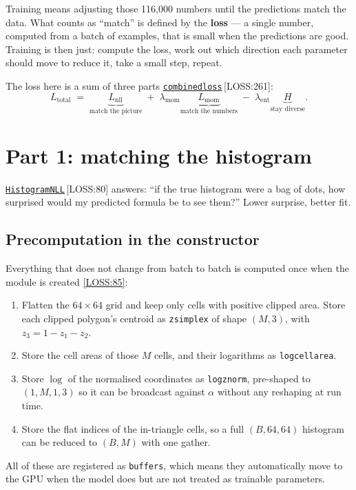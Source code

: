 \documentclass[11pt,a4paper]{report}
\newcommand{\srcbase}{vscode://file/Users/syellapa/Documents/Research/2026/ANSYS/Multi-ScalarPDF}
\newcommand{\dmdn}{dirichlet\string_mdn}
\newcommand{\srctag}[1]{{\footnotesize\textcolor{TagGray}{[#1]}}}
\newcommand{\Loss}[2]{\href{\srcbase/\dmdn/losses.py:#1}{\texttt{#2}}\,\srctag{LOSS:#1}}
\newcommand{\LossL}[1]{\href{\srcbase/\dmdn/losses.py:#1}{\srctag{LOSS:#1}}}
\newcommand{\code}[1]{\texttt{#1}}
\newcommand{\term}[1]{\textbf{#1}}
\renewcommand{\_}{\origtextunderscore\allowbreak}
\begin{document}
Training means adjusting those 116{,}000 numbers until the predictions match the data. What
counts as ``match'' is defined by the \term{loss} --- a single number, computed from a batch of
examples, that is small when the predictions are good. Training is then just: compute the
loss, work out which direction each parameter should move to reduce it, take a small step,
repeat.

The loss here is a sum of three parts \Loss{261}{combined\_loss}:
\[
  L_{\text{total}} \;=\; \underbrace{L_{\text{nll}}}_{\text{match the picture}}
  \;+\; \lambda_{\text{mom}} \underbrace{L_{\text{mom}}}_{\text{match the numbers}}
  \;-\; \lambda_{\text{ent}} \underbrace{H}_{\text{stay diverse}} .
\]

\section{Part 1: matching the histogram}
\label{sec:nll}

\Loss{80}{HistogramNLL} answers: ``if the true histogram were a bag of dots, how surprised
would my predicted formula be to see them?'' Lower surprise, better fit.

\subsection*{Precomputation in the constructor}

Everything that does not change from batch to batch is computed once when the module is
created \LossL{85}:

\begin{enumerate}
  \item Flatten the $64\times64$ grid and keep only cells with positive clipped area. Store
        each clipped polygon's centroid as \code{z\_simplex} of shape $(M, 3)$, with
        $z_3 = 1-z_1-z_2$.
  \item Store the cell areas of those $M$ cells, and their logarithms as \code{log\_cell\_area}.
  \item Store $\log$ of the normalised coordinates as \code{log\_z\_norm}, pre-shaped to
        $(1, M, 1, 3)$ so it can be broadcast against $\alpha$ without any reshaping at
        run time.
  \item Store the flat indices of the in-triangle cells, so a full $(B, 64, 64)$ histogram can
        be reduced to $(B, M)$ with one gather.
\end{enumerate}

All of these are registered as \code{buffers}, which means they automatically move to the GPU
when the model does but are not treated as trainable parameters.
\end{document}
